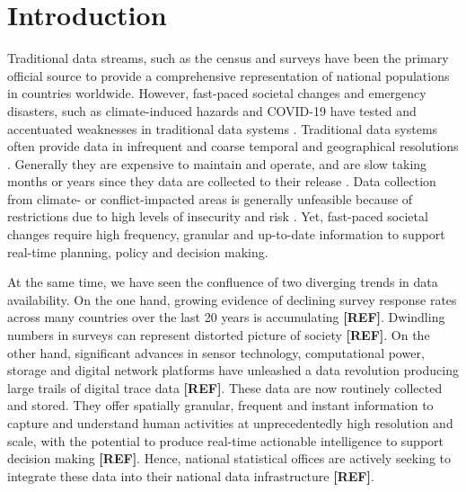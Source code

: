 \documentclass[]{rsos}%
\begin{document}
\providecommand{\EndFirstPage}{%
}

\maketitle

\newpage

\section{Introduction}\label{introduction}

Traditional data streams, such as the census and surveys have been the
primary official source to provide a comprehensive representation of
national populations in countries worldwide. However, fast-paced
societal changes and emergency disasters, such as climate-induced
hazards and COVID-19 have tested and accentuated weaknesses in
traditional data systems \citep{green2021}. Traditional data systems often
provide data in infrequent and coarse temporal and geographical
resolutions \citep{rowe23-bigdata}. Generally they are expensive to maintain
and operate, and are slow taking months or years since they data are
collected to their release \citep{rowe23-bigdata}. Data collection from
climate- or conflict-impacted areas is generally unfeasible because of
restrictions due to high levels of insecurity and risk
\citep{iradukunda2025}. Yet, fast-paced societal changes require high
frequency, granular and up-to-date information to support real-time
planning, policy and decision making.

At the same time, we have seen the confluence of two diverging trends in
data availability. On the one hand, growing evidence of declining survey
response rates across many countries over the last 20 years is
accumulating \textbf{{[}REF{]}}. Dwindling numbers in surveys can represent
distorted picture of society \textbf{{[}REF{]}}. On the other hand, significant
advances in sensor technology, computational power, storage and digital
network platforms have unleashed a data revolution producing large
trails of digital trace data \textbf{{[}REF{]}}. These data are now routinely
collected and stored. They offer spatially granular, frequent and
instant information to capture and understand human activities at
unprecedentedly high resolution and scale, with the potential to produce
real-time actionable intelligence to support decision making \textbf{{[}REF{]}}.
Hence, national statistical offices are actively seeking to integrate
these data into their national data infrastructure \textbf{{[}REF{]}}.
\end{document}

